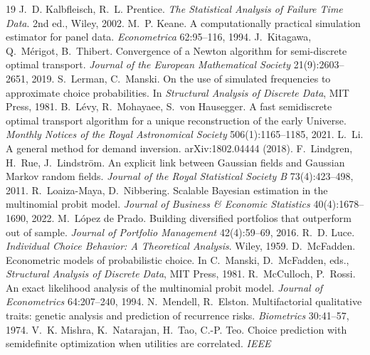 \documentclass[11pt]{article}
\begin{document}
\begin{thebibliography}{19}
J.~D. Kalbfleisch, R.~L. Prentice. \emph{The Statistical Analysis of
Failure Time Data}. 2nd ed., Wiley, 2002.
 M.~P. Keane.
A computationally practical simulation estimator for panel data.
\emph{Econometrica} 62:95--116, 1994.
 J.~Kitagawa, Q.~M\'erigot, B.~Thibert.
Convergence of a Newton algorithm for semi-discrete optimal transport.
\emph{Journal of the European Mathematical Society} 21(9):2603--2651,
2019.
 S.~Lerman, C.~Manski.
On the use of simulated frequencies to approximate choice probabilities.
In \emph{Structural Analysis of Discrete Data}, MIT Press, 1981.
 B.~L\'evy, R.~Mohayaee, S.~von Hausegger. A fast
semidiscrete optimal transport algorithm for a unique reconstruction of
the early Universe. \emph{Monthly Notices of the Royal Astronomical
Society} 506(1):1165--1185, 2021.
 L.~Li. A general method for demand
inversion. arXiv:1802.04444 (2018).
 F.~Lindgren, H.~Rue,
J.~Lindstr\"om. An explicit link between Gaussian fields and Gaussian Markov
random fields. \emph{Journal of the Royal Statistical Society B}
73(4):423--498, 2011.
 R.~Loaiza-Maya,
D.~Nibbering. Scalable Bayesian estimation in the multinomial probit
model. \emph{Journal of Business \& Economic Statistics}
40(4):1678--1690, 2022.
 M.~L\'opez de Prado.
Building diversified portfolios that outperform out of sample.
\emph{Journal of Portfolio Management} 42(4):59--69, 2016.
 R.~D. Luce. \emph{Individual Choice
Behavior: A Theoretical Analysis}. Wiley, 1959.
 D.~McFadden.
Econometric models of probabilistic choice. In C.~Manski, D.~McFadden,
eds., \emph{Structural Analysis of Discrete Data}, MIT Press, 1981.
 R.~McCulloch, P.~Rossi.
An exact likelihood analysis of the multinomial probit model.
\emph{Journal of Econometrics} 64:207--240, 1994.
 N.~Mendell, R.~Elston.
Multifactorial qualitative traits: genetic analysis and prediction of
recurrence risks. \emph{Biometrics} 30:41--57, 1974.
V.~K. Mishra, K.~Natarajan, H.~Tao, C.-P. Teo. Choice prediction with
semidefinite optimization when utilities are correlated. \emph{IEEE
}
\end{thebibliography}
\end{document}
